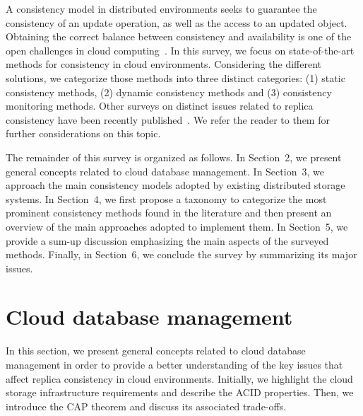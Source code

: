A consistency model in distributed environments seeks to guarantee the consistency of an update operation, as well as the access to an updated object. Obtaining the correct balance between consistency and availability is one of the open challenges in cloud computing~\cite{Elbushra:2014}. In this survey, we focus on state-of-the-art  methods for consistency in cloud environments. Considering the different solutions, we categorize those methods into three distinct categories: (1) static consistency methods, (2) dynamic consistency methods and (3) consistency monitoring methods. Other surveys on distinct issues related to %
{\al replica} consistency have been recently published~\cite{agrawal2015taxonomy,viotti2016consistency}. We refer the reader to them for further considerations on this topic. 

The remainder of this survey is organized as follows. In Section~2, we present general concepts related to cloud database management. In Section~3, we approach the main consistency models adopted by existing distributed storage systems. 
In Section~4, we first propose a taxonomy to categorize the most prominent consistency methods found in the literature and then present an overview of the main approaches adopted to implement them. In Section~5, we provide a sum-up discussion emphasizing the main aspects of the surveyed methods.
Finally, in Section~6, we conclude the survey by summarizing its major issues.

\section{Cloud database %
	management}
\label{sec:1}
In this section, we present general concepts related to cloud database management in order to provide a better understanding of the key issues that affect replica consistency in cloud environments. 
Initially, 
we highlight the cloud storage infrastructure requirements and describe the ACID properties. Then, we introduce the CAP theorem and discuss its associated trade-offs. 

